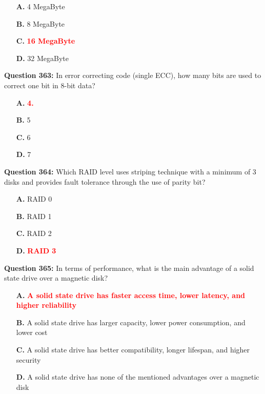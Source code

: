 \documentclass[12pt,a4paper]{article}
\begin{document}
\begin{itemize}
    \item[\textbf{A.}] 4 MegaByte
    \item[\textbf{B.}] 8 MegaByte
    \item[\textbf{C.}] \textcolor{red}{\textbf{16 MegaByte}}
    \item[\textbf{D.}] 32 MegaByte
\end{itemize}

\vspace{0.5cm}

\textbf{Question 363:} In error correcting code (single ECC), how many bits are used to correct one bit in 8-bit data?

\begin{itemize}
    \item[\textbf{A.}] \textcolor{red}{\textbf{4.}}
    \item[\textbf{B.}] 5
    \item[\textbf{C.}] 6
    \item[\textbf{D.}] 7
\end{itemize}

\vspace{0.5cm}

\textbf{Question 364:} Which RAID level uses striping technique with a minimum of 3 disks and provides fault tolerance through the use of parity bit?

\begin{itemize}
    \item[\textbf{A.}] RAID 0
    \item[\textbf{B.}] RAID 1
    \item[\textbf{C.}] RAID 2
    \item[\textbf{D.}] \textcolor{red}{\textbf{RAID 3}}
\end{itemize}

\vspace{0.5cm}

\textbf{Question 365:} In terms of performance, what is the main advantage of a solid state drive over a magnetic disk?

\begin{itemize}
    \item[\textbf{A.}] \textcolor{red}{\textbf{A solid state drive has faster access time, lower latency, and higher reliability}}
    \item[\textbf{B.}] A solid state drive has larger capacity, lower power consumption, and lower cost
    \item[\textbf{C.}] A solid state drive has better compatibility, longer lifespan, and higher security
    \item[\textbf{D.}] A solid state drive has none of the mentioned advantages over a magnetic disk
\end{itemize}
\end{document}

